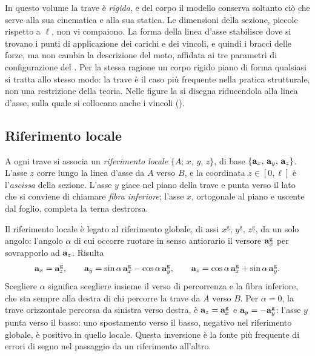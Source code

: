 In questo volume la trave è
\emph{rigida}, e del corpo
il modello conserva soltanto ciò che serve alla sua
cinematica e alla sua statica. Le dimensioni della
sezione, piccole rispetto a $\ell$, non vi compaiono.
La forma della linea d'asse stabilisce dove si trovano i
punti di applicazione dei carichi e dei vincoli, e quindi
i bracci delle forze, ma non cambia la descrizione del
moto, affidata ai tre parametri di configurazione del
. Per la stessa ragione un corpo
rigido piano di forma qualsiasi si tratta allo stesso
modo: la trave è il caso più frequente nella pratica
strutturale, non una restrizione della teoria. Nelle
figure la si disegna riducendola alla linea d'asse, sulla
quale si collocano anche i vincoli
().





\subsection{Riferimento locale}
\label{sec:riferimento_intrinseco}

A ogni trave si associa un \emph{riferimento
	locale}
$\{A;\,x,\,y,\,z\}$, di base
$\{\mathbf{a}_x,\,\mathbf{a}_y,\,\mathbf{a}_z\}$.
L'asse $z$ corre lungo la linea d'asse da $A$ verso $B$,
e la coordinata $z \in [0,\ell]$ è l'\emph{ascissa}
della sezione. L'asse $y$ giace nel piano della trave e
punta verso il lato che si conviene di chiamare
\emph{fibra inferiore}; l'asse
$x$, ortogonale al piano e uscente dal foglio, completa
la terna destrorsa.

Il riferimento locale è legato al riferimento globale,
di assi $x^{\mathrm{g}}$, $y^{\mathrm{g}}$, $z^{\mathrm{g}}$,
da un solo angolo: l'angolo $\alpha$ di cui occorre
ruotare in senso antiorario il versore
$\mathbf{a}_x^{\mathrm{g}}$ per sovrapporlo ad $\mathbf{a}_z$. Risulta
\begin{equation}\label{eq:base_locale}
	\mathbf{a}_x = \mathbf{a}_z^{\mathrm{g}}, \qquad
	\mathbf{a}_y = \sin\alpha\,\mathbf{a}_x^{\mathrm{g}} - \cos\alpha\,\mathbf{a}_y^{\mathrm{g}}, \qquad
	\mathbf{a}_z = \cos\alpha\,\mathbf{a}_x^{\mathrm{g}} + \sin\alpha\,\mathbf{a}_y^{\mathrm{g}}.
\end{equation}
Scegliere $\alpha$ significa scegliere insieme il verso
di percorrenza e la fibra inferiore, che sta sempre alla
destra di chi percorre la trave da $A$ verso $B$. Per
$\alpha = 0$, la trave orizzontale percorsa da sinistra
verso destra, è $\mathbf{a}_z = \mathbf{a}_x^{\mathrm{g}}$ e
$\mathbf{a}_y = -\mathbf{a}_y^{\mathrm{g}}$: l'asse $y$ punta verso il
basso: uno spostamento verso il basso, negativo nel
riferimento globale, è positivo in quello locale. Questa
inversione è la fonte più frequente di errori di segno
nel passaggio da un riferimento all'altro.

